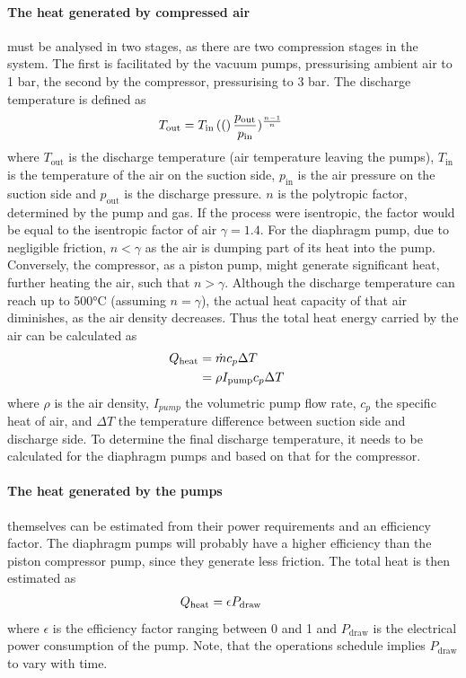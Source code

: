 \paragraph{The heat generated by compressed air} must be analysed in two stages, as there are two compression stages in the system. The first is facilitated by the vacuum pumps, pressurising ambient air to 1 bar, the second by the compressor, pressurising to 3 bar. The discharge temperature is defined as 
\begin{align}
    T_\mathrm{out}&=T_\mathrm{in}\left( ( \right)\frac{p_\mathrm{out}}{p_\mathrm{in}})^{\frac{n-1}{n}}\quad
\end{align}
where $T_\mathrm{out}$ is the discharge temperature (air temperature leaving the pumps), $T_\mathrm{in}$ is the temperature of the air on the suction side, $p_\mathrm{in}$ is the air pressure on the suction side and $p_\mathrm{out}$ is the discharge pressure. $n$ is the polytropic factor, determined by the pump and gas. If the process were isentropic, the factor would be equal to the isentropic factor of air $\gamma=1.4$. For the diaphragm pump, due to negligible friction, $n<\gamma$ as the air is dumping part of its heat into the pump.
Conversely, the compressor, as a piston pump, might generate significant heat, further heating the air, such that $n>\gamma$.
Although the discharge temperature can reach up to 500°C (assuming $n=\gamma$), the actual heat capacity of that air diminishes, as the air density decreases. Thus the total heat energy carried by the air can be calculated as  
\begin{align}
    Q_\mathrm{heat} &= \dot{m}c_p\Delta T\\ 
    &= \rho I_\mathrm{pump} c_p\Delta T\quad
\end{align}
where $\rho$ is the air density, $I_{pump}$ the volumetric pump flow rate, $c_p$ the specific heat of air, and $\Delta T$ the temperature difference between suction side and discharge side. To determine the final discharge temperature, it needs to be calculated for the diaphragm pumps and based on that for the compressor.

\paragraph{The heat generated by the pumps} themselves can be estimated from their power requirements and an efficiency factor. The diaphragm pumps will probably have a higher efficiency than the piston compressor pump, since they generate less friction. The total heat is then estimated as 
\begin{align}
    Q_\mathrm{heat} &= \epsilon P_\mathrm{draw}\quad
\end{align}
where $\epsilon$ is the efficiency factor ranging between 0 and 1 and $P_\mathrm{draw}$ is the electrical power consumption of the pump. Note, that the operations schedule implies $P_\mathrm{draw}$ to vary with time.

